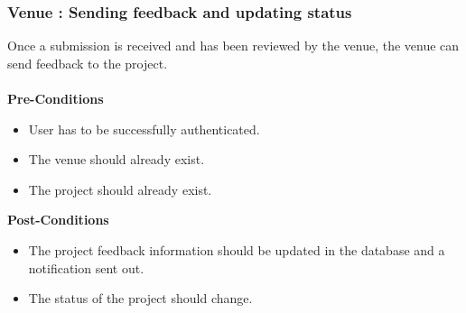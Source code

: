 \subsubsection{Venue : Sending feedback and updating status}
Once a submission is received and has been reviewed by the venue, the venue can send feedback to the project.\\ \\
\textbf{Pre-Conditions}
\begin{itemize}
	\item User has to be successfully authenticated.
	\item The venue should already exist.
	\item The project should already exist.\\
\end{itemize}
\textbf{Post-Conditions}
\begin{itemize}
	\item The project feedback information should be updated in the database and a notification sent out.
	\item The status of the project should change.\\
\end{itemize}